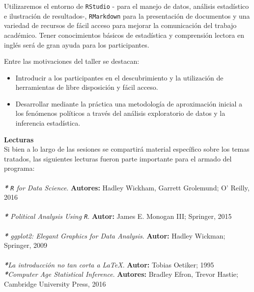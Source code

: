 \documentclass[11pt]{article}
\begin{document}
\vspace{.5cm}

Utilizaremos el entorno de \verb=RStudio= - para el manejo de datos, análisis estadístico e ilustración de resultados-, \verb=RMarkdown= para la presentación de documentos y una variedad de recursos de fácil acceso para mejorar la comunicación del trabajo académico. Tener conocimientos básicos de estadística y comprensión lectora en inglés será de gran ayuda para los participantes.

\vspace{.7cm}
Entre las motivaciones del taller se destacan:
\begin{itemize}
 \itemsep-0.4em
  \item  Introducir a los participantes en el descubrimiento y la utilización de herramientas de libre disposición y fácil acceso. 
  \item Desarrollar mediante la práctica una metodología de aproximación inicial a los fenómenos políticos a través del análisis exploratorio de datos y la inferencia estadística. 
\end{itemize}
\clearpage
\vspace{6mm}
\textbf {\large Lecturas}\\

Si bien a lo largo de las sesiones se compartirá material específico sobre los temas tratados, las siguientes lecturas fueron parte importante para el armado del programa: \\
\\
\emph{\textbf{*} \texttt{R} for Data Science}.
\textbf {Autores:} Hadley Wickham, Garrett Grolemund;  O' Reilly, 2016 \\ \\
\emph{\textbf{*} Political Analysis Using \texttt{R}}.
\textbf {Autor:} James E. Monogan III;  Springer, 2015\\ \\
\emph{\textbf{*} \textit{ggplot2: Elegant Graphics for Data Analysis}}.
\textbf {Autor:} Hadley Wickman;  Springer, 2009 \\
\\
\emph{\textbf{*}La introducción no tan corta a \LaTeX}.
\textbf {Autor:} Tobias Oetiker;  1995 \\

\emph{\textbf{*}Computer Age Statistical Inference}.
\textbf {Autores:} Bradley Efron, Trevor Hastie; Cambridge University Press, 2016 \\

\vspace{2cm}
\end{document}
